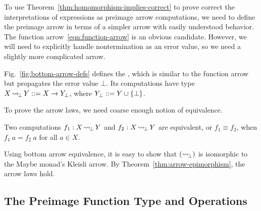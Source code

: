 \documentclass{llncs}
\newcommand{\figref}[1]{Fig.~\ref{#1}}
\newcommand{\arrow}{\rightsquigarrow}
\DeclareMathOperator{\botto}{{\arrow\mspace{-3mu}}_\bot}
\begin{document}
To use Theorem~\ref{thm:homomorphism-implies-correct} to prove correct the interpretations of expressions as preimage arrow computations, we need to define the preimage arrow in terms of a simpler arrow with easily understood behavior.
The function arrow~\eqref{eqn:function-arrow} is an obvious candidate.
However, we will need to explicitly handle nontermination as an error value, so we need a slightly more complicated arrow.

\figref{fig:bottom-arrow-defs} defines the , which is similar to the function arrow but propagates the error value $\bot$.
Its computations have type $X \botto Y ::= X \to Y_\bot$, where $Y_\bot ::= Y \cup \{{\bot}\}$.

To prove the arrow laws, we need coarse enough notion of equivalence.

\begin{definition}
Two computations $f_1 : X \botto Y$ and $f_2 : X \botto Y$ are equivalent, or $f_1 \equiv f_2$, when $f_1~a = f_2~a$ for all $a \in X$.
\end{definition}

Using bottom arrow equivalence, it is easy to show that $(\botto)$ is isomorphic to the Maybe monad's Kleisli arrow.
By Theorem~\ref{thm:arrow-epimorphism}, the arrow laws hold.

\subsection{The Preimage Function Type and Operations}
\label{sec:lazy-preimage-mappings}
\end{document}
